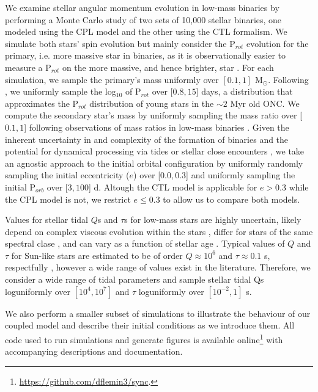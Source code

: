 \documentclass[twocolumn]{aastex61}
\begin{document}
We examine stellar angular momentum evolution in low-mass binaries by performing a Monte Carlo study of two sets of 10,000 stellar binaries, one modeled using the CPL model and the other using the CTL formalism.  We simulate both stars' spin evolution but mainly consider the P$_{rot}$ evolution for the primary, i.e. more massive star in binaries, as it is observationally easier to measure a P$_{rot}$ on the more massive, and hence brighter, star \citep[e.g.][]{Meibom2006,Lurie2017}. For each simulation, we sample the primary's mass uniformly over $[0.1, 1]$ M$_{\odot}$. Following \citet{Matt2015}, we uniformly sample the log$_{10}$ of P$_{rot}$ over [$0.8,15$] days, a distribution that approximates the P$_{rot}$ distribution of young stars in the ${\sim}2$ Myr old ONC.  We compute the secondary star's mass by uniformly sampling the mass ratio over [$0.1, 1$] following observations of mass ratios in low-mass binaries \citep{Raghavan2010,Moe2018}. Given the inherent uncertainty in and complexity of the formation of binaries \citep[e.g.][]{Bonnell1994,Bate2000,Bate2002,Moe2018} and the potential for dynamical processing via tides or stellar close encounters \citep[e.g.][]{Mardling2001,Hurley2002,Ivanova2005,Meibom2005}, we take an agnostic approach to the initial orbital configuration by uniformly randomly sampling the initial eccentricity ($e$) over [$0.0,0.3$] and uniformly sampling the initial P$_{orb}$ over [$3,100$] d. Altough the CTL model is applicable for $e > 0.3$ while the CPL model is not, we restrict $e \leq 0.3$ to allow us to compare both models.

Values for stellar tidal $Q$s and $\tau$s for low-mass stars are highly uncertain, likely depend on complex viscous evolution within the stars \citep{Ogilvie2007}, differ for stars of the same spectral clase \citep{Barker2009}, and can vary as a function of stellar age \citep{Bolmont2016}. Typical values of $Q$ and $\tau$ for Sun-like stars are estimated to be of order $Q \approx 10^6$ and $\tau \approx 0.1$ s, respectfully \citep[e.g.][]{Meibom2005,Ogilvie2007,Jackson2009}, however a wide range of values exist in the literature.  Therefore, we consider a wide range of tidal parameters and sample stellar tidal Qs loguniformly over $[10^4,10^7]$ and $\tau$ loguniformly over $[10^{-2},1]$ s.

We also perform a smaller subset of simulations to illustrate the behaviour of our coupled model and describe their initial conditions as we introduce them. All code used to run simulations and generate figures is available online\footnote{\href{https://github.com/dflemin3/sync}{https://github.com/dflemin3/sync}.} with accompanying descriptions and documentation.
\end{document}
